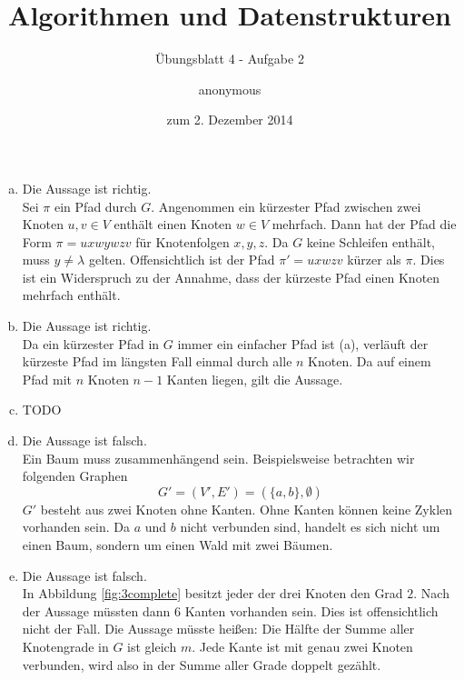 \documentclass[a4paper]{scrartcl}
\title{Algorithmen und Datenstrukturen}
\subtitle{Übungsblatt 4 - Aufgabe 2}
\author{
    anonymous
}
\date{zum 2. Dezember 2014}
\begin{document}
\maketitle

\begin{enumerate}[(a)]
    \item
        Die Aussage ist richtig. \\
        Sei $\pi$ ein Pfad durch $G$.
        Angenommen ein kürzester Pfad zwischen zwei Knoten $u,v \in V$ enthält
        einen Knoten $w \in V$ mehrfach.
        Dann hat der Pfad die Form $\pi = uxwywzv$ für Knotenfolgen $x, y, z$.
        Da $G$ keine Schleifen enthält, muss $y \neq \lambda$ gelten.
        Offensichtlich ist der Pfad $\pi' = uxwzv$ kürzer als $\pi$.
        Dies ist ein Widerspruch zu der Annahme, dass der kürzeste Pfad einen
        Knoten mehrfach enthält.

    \item
        Die Aussage ist richtig. \\
        Da ein kürzester Pfad in $G$ immer ein einfacher Pfad ist (a), verläuft
        der kürzeste Pfad im längsten Fall einmal durch alle $n$ Knoten.
        Da auf einem Pfad mit $n$ Knoten $n-1$ Kanten liegen, gilt die Aussage.

    \item
        TODO

    \item
        Die Aussage ist falsch. \\
        Ein Baum muss zusammenhängend sein.
        Beispielsweise betrachten wir folgenden Graphen
        \begin{equation}
            G' = (V', E') = (\{a, b\}, \emptyset)
        \end{equation}
        $G'$ besteht aus zwei Knoten ohne Kanten.
        Ohne Kanten können keine Zyklen vorhanden sein.
        Da $a$ und $b$ nicht verbunden sind, handelt es sich nicht um einen
        Baum, sondern um einen Wald mit zwei Bäumen.

    \item
        Die Aussage ist falsch. \\
        In Abbildung \ref{fig:3complete} besitzt jeder der drei Knoten den Grad
        $2$.
        Nach der Aussage müssten dann $6$ Kanten vorhanden sein.
        Dies ist offensichtlich nicht der Fall.
        Die Aussage müsste heißen: Die Hälfte der Summe aller Knotengrade in $G$
        ist gleich $m$.
        Jede Kante ist mit genau zwei Knoten verbunden, wird also in der Summe
        aller Grade doppelt gezählt.


\end{enumerate}
\end{document}

